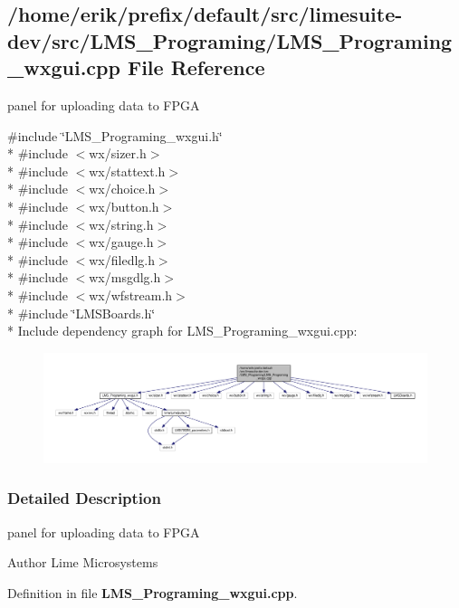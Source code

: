 \subsection{/home/erik/prefix/default/src/limesuite-\/dev/src/\+L\+M\+S\+\_\+\+Programing/\+L\+M\+S\+\_\+\+Programing\+\_\+wxgui.cpp File Reference}
\label{LMS__Programing__wxgui_8cpp}


panel for uploading data to F\+P\+GA  


{\ttfamily \#include \char`\"{}L\+M\+S\+\_\+\+Programing\+\_\+wxgui.\+h\char`\"{}}\\*
{\ttfamily \#include $<$wx/sizer.\+h$>$}\\*
{\ttfamily \#include $<$wx/stattext.\+h$>$}\\*
{\ttfamily \#include $<$wx/choice.\+h$>$}\\*
{\ttfamily \#include $<$wx/button.\+h$>$}\\*
{\ttfamily \#include $<$wx/string.\+h$>$}\\*
{\ttfamily \#include $<$wx/gauge.\+h$>$}\\*
{\ttfamily \#include $<$wx/filedlg.\+h$>$}\\*
{\ttfamily \#include $<$wx/msgdlg.\+h$>$}\\*
{\ttfamily \#include $<$wx/wfstream.\+h$>$}\\*
{\ttfamily \#include \char`\"{}L\+M\+S\+Boards.\+h\char`\"{}}\\*
Include dependency graph for L\+M\+S\+\_\+\+Programing\+\_\+wxgui.\+cpp\+:
\nopagebreak
\begin{figure}[H]
\begin{center}
\leavevmode
\includegraphics[width=350pt]{da/dcb/LMS__Programing__wxgui_8cpp__incl}
\end{center}
\end{figure}


\subsubsection{Detailed Description}
panel for uploading data to F\+P\+GA 

\begin{DoxyAuthor}{Author}
Lime Microsystems 
\end{DoxyAuthor}


Definition in file {\bf L\+M\+S\+\_\+\+Programing\+\_\+wxgui.\+cpp}.

